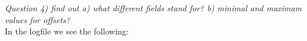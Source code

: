 \documentclass[12pt, a4paper]{article}
\begin{document}


\noindent \textit{Question 4) find out a) what different fields stand for? b) minimal and maximam values for offsets?} \\
In the logfile we see the following: 
\end{document}

